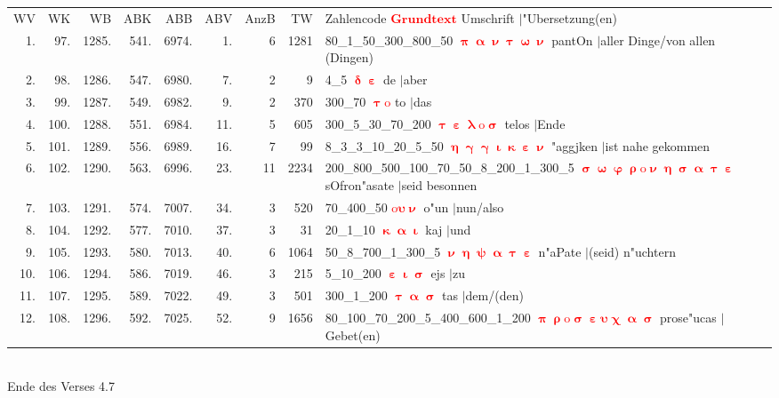 \documentclass[a4paper,10pt,landscape]{article}
\begin{document}
\begin{tabular}{rrrrrrrrp{120mm}}
WV&WK&WB&ABK&ABB&ABV&AnzB&TW&Zahlencode \textcolor{red}{$\boldsymbol{Grundtext}$} Umschrift $|$"Ubersetzung(en)\\
1.&97.&1285.&541.&6974.&1.&6&1281&80\_1\_50\_300\_800\_50 \textcolor{red}{$\boldsymbol{\uppi\upalpha\upnu\uptau\upomega\upnu}$} pantOn $|$aller Dinge/von allen (Dingen)\\
2.&98.&1286.&547.&6980.&7.&2&9&4\_5 \textcolor{red}{$\boldsymbol{\updelta\upepsilon}$} de $|$aber\\
3.&99.&1287.&549.&6982.&9.&2&370&300\_70 \textcolor{red}{$\boldsymbol{\uptau\mathrm{o}}$} to $|$das\\
4.&100.&1288.&551.&6984.&11.&5&605&300\_5\_30\_70\_200 \textcolor{red}{$\boldsymbol{\uptau\upepsilon\uplambda\mathrm{o}\upsigma}$} telos $|$Ende\\
5.&101.&1289.&556.&6989.&16.&7&99&8\_3\_3\_10\_20\_5\_50 \textcolor{red}{$\boldsymbol{\upeta\upgamma\upgamma\upiota\upkappa\upepsilon\upnu}$} "aggjken $|$ist nahe gekommen\\
6.&102.&1290.&563.&6996.&23.&11&2234&200\_800\_500\_100\_70\_50\_8\_200\_1\_300\_5 \textcolor{red}{$\boldsymbol{\upsigma\upomega\upvarphi\uprho\mathrm{o}\upnu\upeta\upsigma\upalpha\uptau\upepsilon}$} sOfron"asate $|$seid besonnen\\
7.&103.&1291.&574.&7007.&34.&3&520&70\_400\_50 \textcolor{red}{$\boldsymbol{\mathrm{o}\upsilon\upnu}$} o"un $|$nun/also\\
8.&104.&1292.&577.&7010.&37.&3&31&20\_1\_10 \textcolor{red}{$\boldsymbol{\upkappa\upalpha\upiota}$} kaj $|$und\\
9.&105.&1293.&580.&7013.&40.&6&1064&50\_8\_700\_1\_300\_5 \textcolor{red}{$\boldsymbol{\upnu\upeta\uppsi\upalpha\uptau\upepsilon}$} n"aPate $|$(seid) n"uchtern\\
10.&106.&1294.&586.&7019.&46.&3&215&5\_10\_200 \textcolor{red}{$\boldsymbol{\upepsilon\upiota\upsigma}$} ejs $|$zu\\
11.&107.&1295.&589.&7022.&49.&3&501&300\_1\_200 \textcolor{red}{$\boldsymbol{\uptau\upalpha\upsigma}$} tas $|$dem/(den)\\
12.&108.&1296.&592.&7025.&52.&9&1656&80\_100\_70\_200\_5\_400\_600\_1\_200 \textcolor{red}{$\boldsymbol{\uppi\uprho\mathrm{o}\upsigma\upepsilon\upsilon\upchi\upalpha\upsigma}$} prose"ucas $|$Gebet(en)\\
\end{tabular}\medskip \\
Ende des Verses 4.7\\
\end{document}
